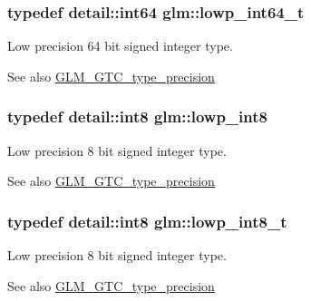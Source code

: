 \subsubsection[{lowp\+\_\+int64\+\_\+t}]{\setlength{\rightskip}{0pt plus 5cm}typedef detail\+::int64 {\bf glm\+::lowp\+\_\+int64\+\_\+t}}\label{group__gtc__type__precision_ga14d72e76d57c7f28eca8e933816c9fd6}
Low precision 64 bit signed integer type. \begin{DoxySeeAlso}{See also}
\hyperlink{group__gtc__type__precision}{G\+L\+M\+\_\+\+G\+T\+C\+\_\+type\+\_\+precision} 
\end{DoxySeeAlso}
\hypertarget{group__gtc__type__precision_gaf9e675b6392764242ae87eb179e9d3d6}{}
\subsubsection[{lowp\+\_\+int8}]{\setlength{\rightskip}{0pt plus 5cm}typedef detail\+::int8 {\bf glm\+::lowp\+\_\+int8}}\label{group__gtc__type__precision_gaf9e675b6392764242ae87eb179e9d3d6}
Low precision 8 bit signed integer type. \begin{DoxySeeAlso}{See also}
\hyperlink{group__gtc__type__precision}{G\+L\+M\+\_\+\+G\+T\+C\+\_\+type\+\_\+precision} 
\end{DoxySeeAlso}
\hypertarget{group__gtc__type__precision_gae6092311f6970a305c2df19a372360a3}{}
\subsubsection[{lowp\+\_\+int8\+\_\+t}]{\setlength{\rightskip}{0pt plus 5cm}typedef detail\+::int8 {\bf glm\+::lowp\+\_\+int8\+\_\+t}}\label{group__gtc__type__precision_gae6092311f6970a305c2df19a372360a3}
Low precision 8 bit signed integer type. \begin{DoxySeeAlso}{See also}
\hyperlink{group__gtc__type__precision}{G\+L\+M\+\_\+\+G\+T\+C\+\_\+type\+\_\+precision} 
\end{DoxySeeAlso}
\hypertarget{group__gtc__type__precision_ga22c5364f27caa0a6eb0627cbc21e46be}{}
